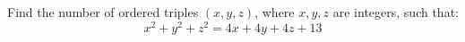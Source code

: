 Find the number of ordered triples $(x, y, z)$, where $x, y, z$ are integers, such that: \[x^2 + y^2 + z^2 = 4x + 4y + 4z + 13\]

